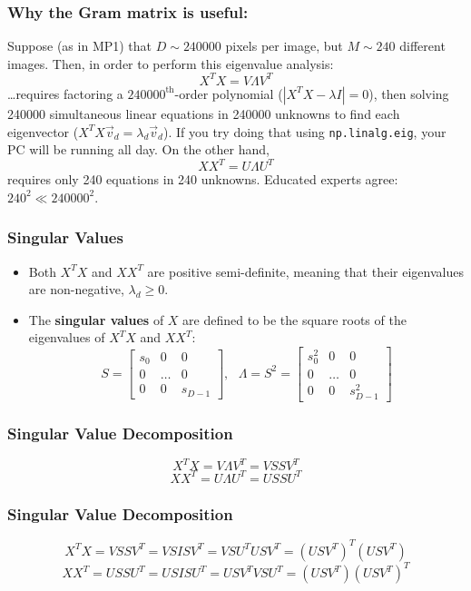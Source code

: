 \documentclass{beamer}
\begin{document}
\begin{frame}
  \frametitle{Why the Gram matrix is useful:}

  Suppose (as in MP1) that $D\sim 240000$ pixels per image, but $M\sim
  240$ different images.  Then, in order to perform this eigenvalue
  analysis:
  \[
  X^TX = V\Lambda V^T
  \]
  \ldots requires factoring a $240000^{\textrm{th}}$-order polynomial
  ($|X^TX-\lambda I|=0$), then solving 240000 simultaneous linear
  equations in 240000 unknowns to find each eigenvector
  ($X^TX\vec{v}_d=\lambda_d\vec{v}_d$).  If you try doing that using
  {\tt np.linalg.eig}, your PC will be running all day.  On the other
  hand,
  \[
  XX^T=U\Lambda U^T
  \]
  requires only 240 equations in 240 unknowns.  Educated experts
  agree: $240^2 \ll 240000^2$.
\end{frame}
  
\begin{frame}
  \frametitle{Singular Values}
  \begin{itemize}
  \item Both $X^TX$ and $XX^T$ are positive semi-definite, meaning
    that their eigenvalues are non-negative, $\lambda_d\ge 0$.
  \item The {\bf singular values} of $X$ are defined to be the
    square roots of the eigenvalues of $X^TX$ and $XX^T$:
    \[
    S=\left[\begin{array}{ccc}s_0&0&0\\0&\ldots&0\\0&0&s_{D-1}\end{array}\right],~~~
    \Lambda=S^2=\left[\begin{array}{ccc}s_0^2&0&0\\0&\ldots&0\\0&0&s_{D-1}^2\end{array}\right]
    \]
  \end{itemize}
\end{frame}

\begin{frame}
  \frametitle{Singular Value Decomposition}
  \[
  X^TX=V\Lambda V^T = VSSV^T
  \]
  \[
  XX^T=U\Lambda U^T = USSU^T
  \]
\end{frame}

\begin{frame}
  \frametitle{Singular Value Decomposition}
  \[
  X^TX= VSSV^T= VSISV^T= VSU^TUSV^T = (USV^T)^T(USV^T)
  \]
  \[
  XX^T= USSU^T= USISU^T= USV^TVSU^T = (USV^T)(USV^T)^T
  \]
\end{frame}
\end{document}
